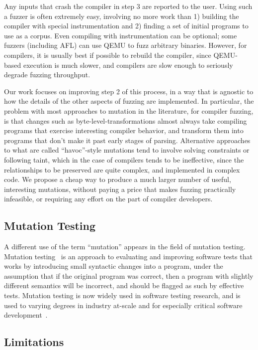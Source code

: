 Any inputs that crash the compiler in step 3 are reported to the user.  Using such a fuzzer is often extremely easy, involving no more work than 1) building the compiler with special instrumentation and 2) finding a set of initial programs to use as a corpus.  Even compiling with instrumentation can be optional; some fuzzers (including AFL) can use QEMU to fuzz arbitrary binaries.  However, for compilers, it is usually best if possible to rebuild the compiler, since QEMU-based execution is much slower, and compilers are slow enough to seriously degrade fuzzing throughput.

Our work focuses on improving step 2 of this process, in a way that is agnostic to how the details of the other aspects of fuzzing are implemented.  In particular, the problem with most approaches to mutation in the literature, for compiler fuzzing, is that changes such as byte-level-transformations almost always take compiling programs that exercise interesting compiler behavior, and transform them into programs that don't make it past early stages of parsing.  Alternative approaches to what are called ``havoc''-style mutations tend to involve solving constraints or following taint, which in the case of compilers tends to be ineffective, since the relationships to be preserved are quite complex, and implemented in complex code.  We propose a cheap way to produce a much larger number of useful, interesting mutations, without paying a price that makes fuzzing practically infeasible, or requiring any effort on the part of compiler developers.

\subsection{Mutation Testing}

A different use of the term ``mutation'' appears in the field of mutation testing.  Mutation testing~\cite{MutationSurvey,budd1979mutation,demillo1978hints} is an approach to evaluating and improving software tests that works by introducing small syntactic changes into a program, under the assumption that if the original program was correct, then a program with slightly different semantics will be incorrect, and should be flagged as such by effective tests.  Mutation testing is now widely used in software testing research, and is used to varying degrees in industry at-scale and for especially critical software development~\cite{mutKernel,mutGoogle,mutFacebook}.

\subsection{Limitations}

